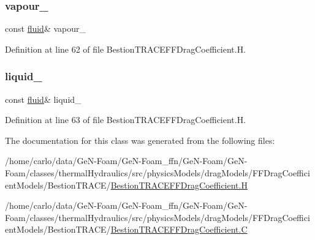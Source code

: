 \subsubsection{\texorpdfstring{vapour\+\_\+}{vapour\_}}
{\footnotesize\ttfamily const \hyperlink{classFoam_1_1fluid}{fluid}\& vapour\+\_\+\hspace{0.3cm}{\ttfamily [protected]}}



Definition at line 62 of file Bestion\+T\+R\+A\+C\+E\+F\+F\+Drag\+Coefficient.\+H.

\mbox{\label{classFoam_1_1FFDragCoefficientModels_1_1BestionTRACE_a908415555f3c334379400a3eb5759639}} 
\subsubsection{\texorpdfstring{liquid\+\_\+}{liquid\_}}
{\footnotesize\ttfamily const \hyperlink{classFoam_1_1fluid}{fluid}\& liquid\+\_\+\hspace{0.3cm}{\ttfamily [protected]}}



Definition at line 63 of file Bestion\+T\+R\+A\+C\+E\+F\+F\+Drag\+Coefficient.\+H.



The documentation for this class was generated from the following files\+:\begin{DoxyCompactItemize}
\item 
/home/carlo/data/\+Ge\+N-\/\+Foam/\+Ge\+N-\/\+Foam\+\_\+ffn/\+Ge\+N-\/\+Foam/\+Ge\+N-\/\+Foam/classes/thermal\+Hydraulics/src/physics\+Models/drag\+Models/\+F\+F\+Drag\+Coefficient\+Models/\+Bestion\+T\+R\+A\+C\+E/\hyperlink{BestionTRACEFFDragCoefficient_8H}{Bestion\+T\+R\+A\+C\+E\+F\+F\+Drag\+Coefficient.\+H}\item 
/home/carlo/data/\+Ge\+N-\/\+Foam/\+Ge\+N-\/\+Foam\+\_\+ffn/\+Ge\+N-\/\+Foam/\+Ge\+N-\/\+Foam/classes/thermal\+Hydraulics/src/physics\+Models/drag\+Models/\+F\+F\+Drag\+Coefficient\+Models/\+Bestion\+T\+R\+A\+C\+E/\hyperlink{BestionTRACEFFDragCoefficient_8C}{Bestion\+T\+R\+A\+C\+E\+F\+F\+Drag\+Coefficient.\+C}\end{DoxyCompactItemize}
